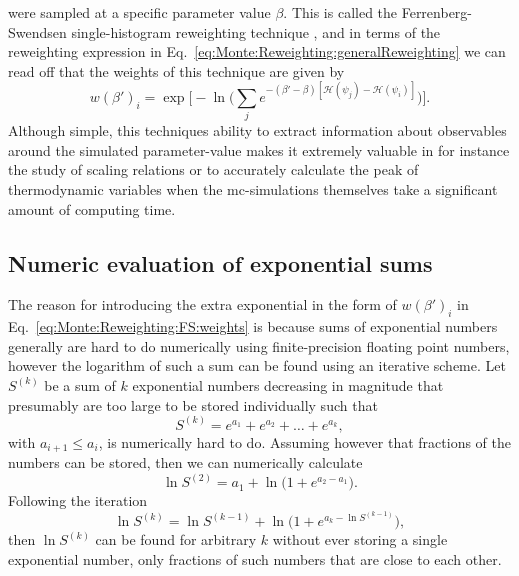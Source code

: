 were sampled at a specific parameter value $\beta$. This is called the Ferrenberg-Swendsen single-histogram reweighting technique \cite{FS_1988}, and in terms of the reweighting
expression in Eq.~\eqref{eq:Monte:Reweighting:generalReweighting} we can read off that the weights of this technique are given by
\begin{equation}
    \label{eq:Monte:Reweighting:FS:weights}
    w(\beta')_i = \exp\Big[-\ln\Big(\sum_je^{-(\beta'-\beta)[\mathcal{H}(\psi_j)-\mathcal{H}(\psi_i)]}\Big)\Big].
\end{equation}
Although simple, this techniques ability to extract information about observables around the simulated parameter-value makes it extremely valuable 
in for instance the study of scaling relations or to accurately calculate the peak of thermodynamic variables when the \ac{mc}-simulations themselves take a significant
amount of computing time.

\subsection{Numeric evaluation of exponential sums}
\label{sec:Monte:Reweighting:expSums}

The reason for introducing the extra exponential in the form of $w(\beta')_i$ in Eq.~\eqref{eq:Monte:Reweighting:FS:weights} is because sums of exponential
numbers generally are hard to do numerically using finite-precision
floating point numbers, however the logarithm of such a sum can be found using an iterative scheme. Let $S^{(k)}$ be a sum of $k$
exponential numbers decreasing in magnitude that presumably are too large to be stored individually such that
\begin{equation}
    \label{eq:Monte:Reweighting:FS:expSum}
    S^{(k)} = e^{a_1} + e^{a_2} + \ldots + e^{a_k},
\end{equation}
with $a_{i+1}\leq a_i$, is numerically hard to do. Assuming however that fractions of the numbers can be stored, then we can numerically calculate
\begin{equation}
    \label{eq:Monte:Reweighting:FS:initialLnSum}
    \ln S^{(2)} = a_1 + \ln\Big(1+e^{a_2-a_1}\Big).
\end{equation}
Following the iteration
\begin{equation}
    \label{eq:Monte:Reweighting:FS:iteratedLnSum}
    \ln S^{(k)} = \ln S^{(k-1)} + \ln\Big(1+e^{a_k-\ln S^{(k-1)}}\Big),
\end{equation}
then $\ln S^{(k)}$ can be found for arbitrary $k$ without ever storing a single exponential number, only fractions of such numbers that are close to each other.

